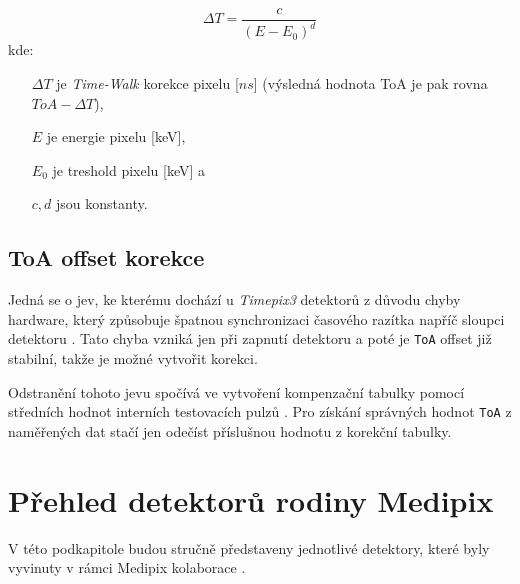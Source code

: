 \begin{equation}\label{eq:det:timeWalk}
	\Delta T = \frac{c}{(E - E_0)^d}
\end{equation}
kde:
\begin{changemargin}{1.5cm}{1cm} 
	\begin{itemize}
		\item [$\Delta T$] je \textit{Time-Walk} korekce pixelu [$ns$] (výsledná hodnota ToA je pak rovna $ToA-\Delta T$),
		\item [$E$] je energie pixelu [keV],
		\item [$E_0$] je treshold pixelu [keV] a
		\item [$c,d$] jsou konstanty.
	\end{itemize}
\end{changemargin}

\subsection{ToA offset korekce}\label{chap:detectors:calibration:toa_correction}
Jedná se o jev, ke kterému dochází u \textit{Timepix3} detektorů z důvodu chyby hardware, který způsobuje špatnou synchronizaci časového razítka napříč sloupci detektoru \cite{Katherine}. Tato chyba vzniká jen při zapnutí detektoru a poté je \texttt{ToA} offset již stabilní, takže je možné vytvořit korekci.

Odstranění tohoto jevu spočívá ve vytvoření kompenzační tabulky pomocí středních hodnot interních testovacích pulzů \cite{timepix3}. Pro získání správných hodnot \texttt{ToA} z naměřených dat stačí jen odečíst příslušnou hodnotu z korekční tabulky.

\section{Přehled detektorů rodiny Medipix}\label{chap:detectors:medipix_overview}
V této podkapitole budou stručně představeny jednotlivé detektory, které byly vyvinuty v rámci Medipix kolaborace \cite{medipix-www}.

